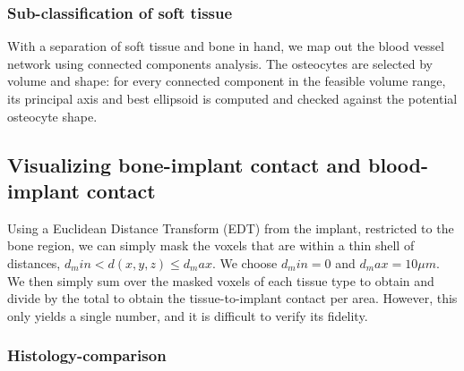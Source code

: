 \subsubsection{Sub-classification of soft tissue}

With a separation of soft tissue and bone in hand, we 
map out the blood vessel network using connected components analysis. 
The osteocytes are selected by volume and shape: for every connected
component in the feasible volume range, its principal axis and best
ellipsoid is computed and checked against the potential osteocyte shape.

\subsection{Visualizing bone-implant contact and blood-implant contact}

Using a Euclidean Distance Transform (EDT) from the implant, restricted to the
bone region, we can simply mask the voxels that are within a thin shell
of distances, $d_min < d(x,y,z) \le d_max$. We choose $d_min = 0$ and
$d_max = 10\mu m$.
We then simply sum over the masked voxels of each tissue type to obtain
and divide by the total to obtain the tissue-to-implant contact per area.
However, this only yields a single number, and it is difficult to verify
its fidelity.

\subsubsection{Histology-comparison}

